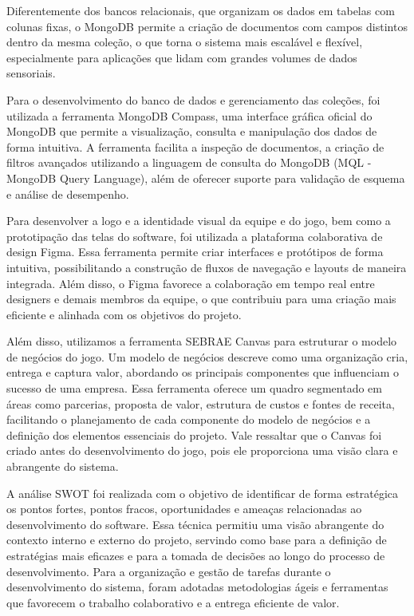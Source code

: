 Diferentemente dos bancos relacionais, que organizam os dados em tabelas com colunas
fixas, o MongoDB permite a criação de documentos com campos distintos dentro da mesma
coleção, o que torna o sistema mais escalável e flexível, especialmente para aplicações que
lidam com grandes volumes de dados sensoriais.

Para o desenvolvimento do banco de dados e gerenciamento das coleções, foi utilizada a
ferramenta MongoDB Compass, uma interface gráfica oficial do MongoDB que permite a
visualização, consulta e manipulação dos dados de forma intuitiva. A ferramenta facilita a
inspeção de documentos, a criação de filtros avançados utilizando a linguagem de consulta
do MongoDB (MQL - MongoDB Query Language), além de oferecer suporte para validação
de esquema e análise de desempenho.

Para desenvolver a logo e a identidade visual da equipe e do jogo, bem como a prototipação
das telas do software, foi utilizada a plataforma colaborativa de design Figma. Essa
ferramenta permite criar interfaces e protótipos de forma intuitiva, possibilitando a
construção de fluxos de navegação e layouts de maneira integrada. Além disso, o Figma
favorece a colaboração em tempo real entre designers e demais membros da equipe, o que
contribuiu para uma criação mais eficiente e alinhada com os objetivos do projeto.\textcite{VillainSilveiraFigma}

Além disso, utilizamos a ferramenta SEBRAE Canvas para estruturar o modelo de negócios do
jogo. Um modelo de negócios descreve como uma organização cria, entrega e captura valor,
abordando os principais componentes que influenciam o sucesso de uma empresa. Essa
ferramenta oferece um quadro segmentado em áreas como parcerias, proposta de valor,
estrutura de custos e fontes de receita, facilitando o planejamento de cada componente do
modelo de negócios e a definição dos elementos essenciais do projeto. Vale ressaltar que o
Canvas foi criado antes do desenvolvimento do jogo, pois ele proporciona uma visão clara e
abrangente do sistema.

A análise SWOT foi realizada com o objetivo de identificar de forma estratégica os pontos
fortes, pontos fracos, oportunidades e ameaças relacionadas ao desenvolvimento do
software. Essa técnica permitiu uma visão abrangente do contexto interno e externo do
projeto, servindo como base para a definição de estratégias mais eficazes e para a tomada
de decisões ao longo do processo de desenvolvimento.
Para a organização e gestão de tarefas durante o desenvolvimento do sistema, foram
adotadas metodologias ágeis e ferramentas que favorecem o trabalho colaborativo e a
entrega eficiente de valor.

